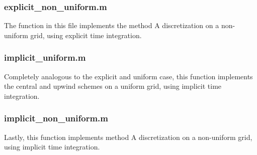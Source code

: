 \subsubsection{explicit\_non\_uniform.m}
The function in this file implements the method A discretization on a non-uniform grid, using explicit time integration.


\subsubsection{implicit\_uniform.m}
Completely analogous to the explicit and uniform case, this function implements the central and upwind schemes on a uniform grid, using implicit time integration.


\subsubsection{implicit\_non\_uniform.m}
Lastly, this function implements method A discretization on a non-uniform grid, using implicit time integration.

